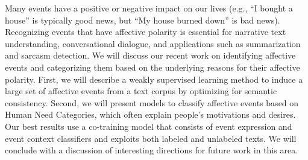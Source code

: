 Many events have a positive or negative impact on our lives (e.g., ``I bought a house'' is typically good news, but ``My house burned down'' is bad news). Recognizing events that have affective polarity is essential for narrative text understanding, conversational dialogue, and applications such as summarization and sarcasm detection. We will discuss our recent work on identifying affective events and categorizing them based on the underlying reasons for their affective polarity. First, we will describe a weakly supervised learning method to induce a large set of affective events from a text corpus by optimizing for semantic consistency.  Second, we will present models to classify affective events based on Human Need Categories, which often explain people's motivations and desires.  Our best results use a co-training model that consists of event expression and event context classifiers and exploits both labeled and unlabeled texts. We will conclude with a discussion of interesting directions for future work in this area.

